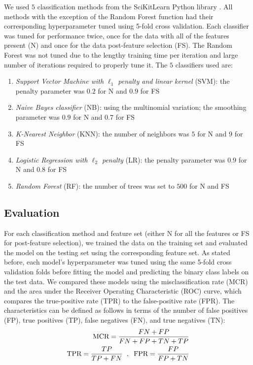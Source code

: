 \documentclass{article} %
\begin{document}
We used $5$ classification methods from the SciKitLearn Python library \cite{skl}. All methods with the exception of the Random Forest function had their corresponding hyperparameter tuned using 5-fold cross validation. Each classifier was tuned for performance twice, once for the data with all of the features present (N) and once for the data post-feature selection (FS). The Random Forest was not tuned due to the lengthy training time per iteration and large number of iterations required to properly tune it. The $5$ classifiers used are:
\begin{enumerate}
\item \textit{Support Vector Machine with $\ell_1$ penalty and linear kernel} (SVM): the penalty parameter was $0.2$ for N and $0.9$ for FS
\item \textit{Naive Bayes classifier} (NB): using the multinomial variation; the smoothing parameter was $0.9$ for N and $0.7$ for FS
\item \textit{K-Nearest Neighbor} (KNN): the number of neighbors was $5$ for N and $9$ for FS
\item \textit{Logistic Regression with $\ell_2$ penalty} (LR): the penalty parameter was $0.9$ for N and $0.8$ for FS
\item \textit{Random Forest} (RF): the number of trees was set to $500$ for N and FS
\end{enumerate}

\subsection{Evaluation}

For each classification method and feature set (either N for all the features or FS for post-feature selection), we trained the data on the training set and evaluated the model on the testing set using the corresponding feature set. As stated before, each model's hyperparameter was tuned using the same 5-fold cross validation folds before fitting the model and predicting the binary class labels on the test data. We compared these models using the misclassification rate (MCR) and the area under the Receiver Operating Characteristic (ROC) curve, which compares the true-positive rate (TPR) to the false-positive rate (FPR). The characteristics can be defined as follows in terms of the number of false positives (FP), true positives (TP), false negatives (FN), and true negatives (TN):
\begin{align*}
\text{MCR} = \frac{FN+FP}{FN+FP+TN+TP} \\
\text{TPR} = \frac{TP}{TP+FN} \hspace{2mm} , \hspace{2mm} \text{FPR} = \frac{FP}{FP+TN}
\end{align*}
\end{document}
